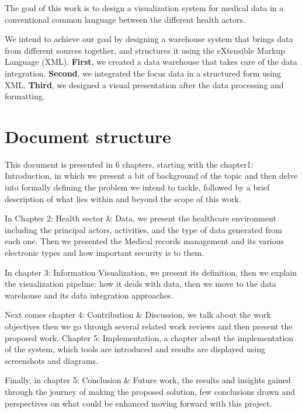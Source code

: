 The goal of this work is to design a visualization system for medical data in a conventional common language between the different health actors.
 
We intend to achieve our goal by designing a warehouse system that brings  data from different sources together, and structures it using the eXtensible Markup Language (XML).
 \newline
 \textbf{First}, we created a data warehouse that takes care of the data integration.\newline 
 \textbf{Second}, we integrated the focus data in a structured form using XML.\newline
 \textbf{Third}, we designed a visual presentation after the data processing and formatting.

 \newpage
\section{Document structure}
This document is presented in 6 chapters, starting with the chapter1: Introduction, in which we present a bit of background of the topic and then delve into formally defining the problem we intend to tackle, followed by a brief description of what lies within and beyond the scope of this work.
 
In Chapter 2: Health sector \& Data, we present the healthcare environment including the principal actors, activities, and the type of data generated from each one. Then we presented the Medical records management and its various electronic types and how important security is to them.
 
In chapter 3: Information Visualization, we present its definition, then we explain the visualization pipeline: how it deals with data, then we move to the data warehouse and its data integration approaches.
 
 Next comes chapter 4: Contribution \& Discussion, we talk about the work objectives then we go through several related work reviews and then present the proposed work. Chapter 5: Implementation, a chapter about the implementation of the system, which tools are introduced and results are displayed using screenshots and diagrams.
 
Finally, in chapter 5: Conclusion \& Future work, the results and insights gained through the journey of making the proposed solution, few conclusions drawn and perspectives on what could be enhanced moving forward with this project.
